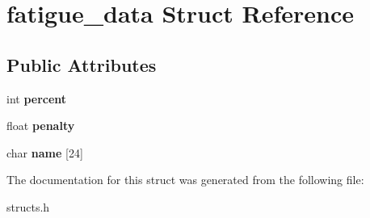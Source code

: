 \hypertarget{structfatigue__data}{\section{fatigue\-\_\-data Struct Reference}
\label{structfatigue__data}
}
\subsection*{Public Attributes}
\begin{DoxyCompactItemize}
\item 
\hypertarget{structfatigue__data_a4ee8c3221b925ef1b15afc2f75a1163a}{int {\bfseries percent}}\label{structfatigue__data_a4ee8c3221b925ef1b15afc2f75a1163a}

\item 
\hypertarget{structfatigue__data_ae3e34243d0c32fb07e4f96d170c7ee64}{float {\bfseries penalty}}\label{structfatigue__data_ae3e34243d0c32fb07e4f96d170c7ee64}

\item 
\hypertarget{structfatigue__data_abbc142d9179a70796f89930cf23423b8}{char {\bfseries name} \mbox{[}24\mbox{]}}\label{structfatigue__data_abbc142d9179a70796f89930cf23423b8}

\end{DoxyCompactItemize}


The documentation for this struct was generated from the following file\-:\begin{DoxyCompactItemize}
\item 
structs.\-h\end{DoxyCompactItemize}
